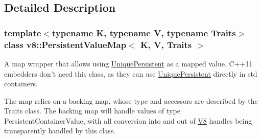 \subsection{Detailed Description}
\subsubsection*{template$<$typename K, typename V, typename Traits$>$class v8\-::\-Persistent\-Value\-Map$<$ K, V, Traits $>$}

A map wrapper that allows using \hyperlink{classv8_1_1UniquePersistent}{Unique\-Persistent} as a mapped value. C++11 embedders don't need this class, as they can use \hyperlink{classv8_1_1UniquePersistent}{Unique\-Persistent} directly in std containers.

The map relies on a backing map, whose type and accessors are described by the Traits class. The backing map will handle values of type Persistent\-Container\-Value, with all conversion into and out of \hyperlink{classv8_1_1V8}{V8} handles being transparently handled by this class. 

